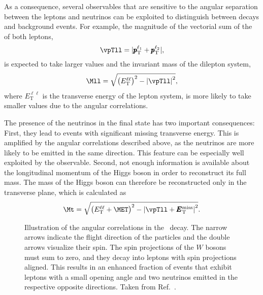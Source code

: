 As a consequence, several observables that are sensitive to the angular separation between the leptons and neutrinos can be exploited to distinguish between \HWWdet decays and background events. 
For example, the magnitude of the vectorial sum of the \pT of both leptons,
\begin{equation}
    \vpTll = |\pmb{p}_\text{T}^{\ell_1} + \pmb{p}_\text{T}^{\ell_2}|,
\end{equation}
is expected to take larger values and the invariant mass of the dilepton system,
\begin{equation}
    \Mll = \sqrt{\left( E_{\mathrm{T}}^{\ell\ell} \right)^2 - \left| \vpTll \right|^2},
\end{equation}
where $E_{\mathrm{T}}^{\ell\ell}$ is the transverse energy of the lepton system, is more likely to take smaller values due to the angular correlations. 

The presence of the neutrinos in the final state has two important consequences:
First, they lead to events with significant missing transverse energy. This is amplified by the angular correlations described above, as the neutrinos are more likely to be emitted in the same direction. This feature can be especially well exploited by the \METSig observable.
Second, not enough information is available about the longitudinal momentum of the Higgs boson in order to reconstruct its full mass. The mass of the Higgs boson can therefore be reconstructed only in the transverse plane, which is calculated as
\begin{equation}
  \Mt = \sqrt{ \left( E_{\mathrm{T}}^{\ell\ell}+\MET \right)^2 - \left| \vpTll + \pmb{E}_{\text{T}}^{\text{miss}} \right|^2 }.
\end{equation}

\begin{figure}
    \caption[Angular correlations in the \HWWdet\ decay.]{Illustration of the angular correlations in the \HWWdet\ decay. The narrow arrows indicate the flight direction of the particles and the double arrows visualize their spin. The spin projections of the $W$ bosons must sum to zero, and they decay into leptons with spin projections aligned. This results in an enhanced fraction of events that exhibit leptons with a small opening angle and two neutrinos emitted in the respective opposite directions. Taken from Ref.~\cite{HIGG-2013-13}.}
    \label{fig:spin-correlations}
\end{figure}

